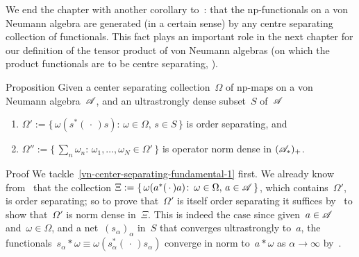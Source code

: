 \documentclass[a]{subfiles}
\begin{document}
\begin{parsec}%
\begin{point}%
We end the chapter 
with another corollary to~:
 that  the np-functionals
on a von Neumann algebra
are generated (in a certain sense)
by any centre separating collection
of functionals. This fact plays
an important role
in the next chapter
for our definition of the tensor product
of von Neumann algebras
(on which the product functionals are to be centre separating,
).
\end{point}
\begin{point}{Proposition}%
Given a center separating collection~$\Omega$ of np-maps
on a von Neumann algebra~$\mathscr{A}$,
and an ultrastrongly dense subset~$S$ of~$\mathscr{A}$
\begin{enumerate}
\item
	\label{vn-center-separating-fundamental-1}
$\Omega':= \{\,\omega(s^*(\,\cdot\,)s)\colon\,
\omega\in\Omega,\,s\in S\,\}$
is order separating, and
\item
	\label{vn-center-separating-fundamental-2}
$\Omega'':=\{\,\sum_n\omega_n\colon\, \omega_1,\dotsc,\omega_N\in\Omega'\,\}$ is operator norm dense in $(\mathscr{A}_*)_+$.
	\end{enumerate}
\begin{point}{Proof}%
We tackle~\ref{vn-center-separating-fundamental-1}
first. We already know from~
that the collection $\Xi:=\{\, \omega(a^*(\,\cdot\,)a)\colon\, 
\omega\in\Omega,\, a\in\mathscr{A}\,\}$,
which contains~$\Omega'$, is order separating;
so to prove that~$\Omega'$ is itself order separating
it suffices by~ to show that~$\Omega'$
is norm dense in~$\Xi$.
This is indeed the case
since given~$a\in\mathscr{A}$
and~$\omega\in\Omega$,
and a net~$(s_\alpha)_\alpha$ in~$S$
that converges ultrastrongly to~$a$,
the functionals~$s_\alpha \ast\omega
\equiv \omega(s_\alpha^*(\,\cdot\,)s_\alpha)$
converge in norm to~$a\ast \omega$
as $\alpha\to\infty$
by~.


\end{point}
\end{point}
\end{parsec}
\end{document}

